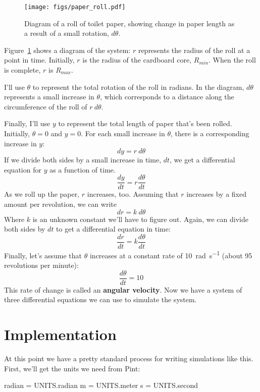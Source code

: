 \documentclass[12pt]{book}
\theoremstyle{exercise}
\begin{document}

\begin{figure}
\centerline{\texttt{[image: figs/paper\_roll.pdf]}}
\caption{Diagram of a roll of toilet paper, showing change in paper length as a result of a small rotation, $d\theta$.}
\label{paper_roll}
\end{figure}

Figure~\ref{paper_roll} shows a diagram of the system: $r$ represents the radius of the roll at a point in time.  Initially, $r$ is the radius of the cardboard core, $R_{min}$.  When the roll is complete, $r$ is $R_{max}$.

I'll use $\theta$ to represent the total rotation of the roll in radians.  In the diagram, $d\theta$ represents a small increase in $\theta$, which corresponds to a distance along the circumference of the roll of $r~d\theta$.


Finally, I'll use $y$ to represent the total length of paper that's been rolled.  Initially, $\theta=0$ and $y=0$.  For each small increase in $\theta$, there is a corresponding increase in $y$:
%
\[ dy = r~d\theta \]
%
If we divide both sides by a small increase in time, $dt$, we get a differential equation for $y$ as a function of time.
%
\[ \frac{dy}{dt} = r \frac{d\theta}{dt} \]
%
As we roll up the paper, $r$ increases, too.  Assuming that $r$ increases by a fixed amount per revolution, we can write
%
\[ dr = k~d\theta \]
%
Where $k$ is an unknown constant we'll have to figure out.  Again, we can divide both sides by $dt$ to get a differential equation in time:
%
\[ \frac{dr}{dt} = k \frac{d\theta}{dt} \]
%
Finally, let's assume that $\theta$ increases at a constant rate of \SI{10}{\radian\per\second} (about 95 revolutions per minute):
%
\[ \frac{d\theta}{dt} = 10  \]
%
This rate of change is called an {\bf angular velocity}.  Now we have a system of three differential equations we can use to simulate the system.



\section{Implementation}
\label{papersim}

At this point we have a pretty standard process for writing simulations like this.  First, we'll get the units we need from Pint:

\begin{python}
radian = UNITS.radian
m = UNITS.meter
s = UNITS.second
\end{python}
\end{document}
